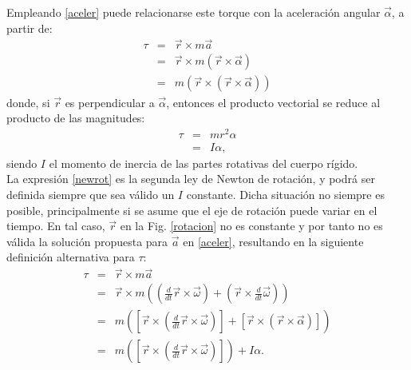 \noindent Empleando \eqref{aceler} puede relacionarse este torque con la aceleración angular $\vec{\alpha}$, a partir de:
\begin{eqnarray*}
\tau & = & \vec{r}\times m\vec{a}\\
     & = & \vec{r}\times m\left(\vec{r} \times \vec{\alpha}\right)\\
     & = & m\left(\vec{r}\times \left(\vec{r} \times \vec{\alpha}\right)\right)
\end{eqnarray*}
donde, si $\vec{r}$ es perpendicular a $\vec{\alpha}$, entonces el producto vectorial se reduce al producto de las magnitudes:
\begin{eqnarray}\label{newrot}
\nonumber \tau & = & m r^2 \alpha \\
               & = & I \alpha,
\end{eqnarray}
siendo $I$ el momento de inercia de las partes rotativas del cuerpo rígido.\\

\noindent La expresión \eqref{newrot} es la segunda ley de Newton de rotación, y podrá ser definida siempre que sea válido un $I$ constante. Dicha situación no siempre es posible, principalmente si se asume que el eje de rotación puede variar en el tiempo. En tal caso, $\vec{r}$ en la Fig. \ref{rotacion} no es constante y por tanto no es válida la solución propuesta para $\vec{a}$ en \eqref{aceler}, resultando en la siguiente definición alternativa para $\tau$:
\begin{eqnarray*}
\tau & = & \vec{r}\times m\vec{a}\\
     & = & \vec{r}\times m\left(\left( \frac{d}{dt}\vec{r}\times \vec{\omega}\right) + \left( \vec{r}\times \frac{d}{dt}\vec{\omega}\right)\right)\\
     & = & m\left(\left[\vec{r}\times\left( \frac{d}{dt}\vec{r}\times \vec{\omega}\right)\right] + \left[\vec{r}\times\left( \vec{r}\times \vec{\alpha}\right)\right]\right)\\
     & = & m\left(\left[\vec{r}\times\left( \frac{d}{dt}\vec{r}\times \vec{\omega}\right)\right]\right) + I\alpha.
\end{eqnarray*}\

